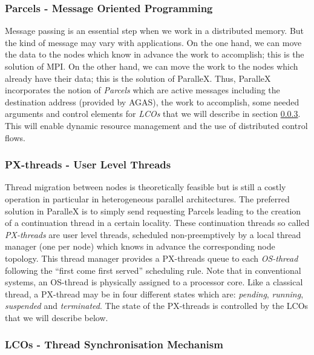 \documentclass{llncs}
\begin{document}
\subsubsection{Parcels - Message Oriented Programming}
Message passing is an essential step when we work in a distributed memory. But
the kind of message may vary with applications. On the one hand, we can move
the data to the nodes which know in advance the work to accomplish; this is the
solution of MPI. On the other hand, we can move the work to the nodes which
already have their data; this is the solution of ParalleX. Thus, ParalleX
incorporates the notion of \emph{Parcels} \cite{ParalleX} which are active
messages including the destination address (provided by AGAS), the work to
accomplish, some needed arguments and control elements for \emph{LCOs} that we
will describe in section \ref{lcos}. This will enable dynamic resource
management and the use of distributed control flows.

\subsubsection{PX-threads - User Level Threads}
Thread migration between nodes is theoretically feasible but is still a costly
operation in particular in heterogeneous parallel architectures. The preferred
solution in ParalleX is to simply send requesting Parcels leading to the
creation of a continuation thread in a certain locality. These continuation
threads so called \emph{PX-threads} \cite{ParalleX} are user level threads,
scheduled non-preemptively by a local thread manager (one per node) which knows
in advance the corresponding node topology. This thread manager provides a
PX-threads queue to each \emph{OS-thread} \cite{ParalleX} following the
\enquote{first come first served} scheduling rule. Note that in conventional
systems, an OS-thread is physically assigned to a processor core. Like a
classical thread, a PX-thread may be in four different states which are:
\emph{pending}, \emph{running}, \emph{suspended} and \emph{terminated}. The
state of the PX-threads is controlled by the LCOs that we will describe below.

\subsubsection{LCOs - Thread Synchronisation Mechanism}\label{lcos}
\end{document}
